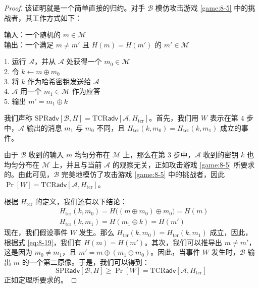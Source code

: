 \begin{proof}
该证明就是一个简单直接的归约。对手 $\mathcal{B}$ 模仿攻击游戏 \ref{game:8-5} 中的挑战者，其工作方式如下：

\vspace{5pt}

\hspace*{5pt} 输入：一个随机的 $m\in\mathcal{M}$\\
\hspace*{26pt} 输出：一个满足 $m\neq m'$ 且 $H(m)=H(m')$ 的 $m'\in\mathcal{M}$

\vspace{5pt}

\hspace*{5pt} 1. \quad 运行 $\mathcal{A}$，并从 $\mathcal{A}$ 处获得一个 $m_0\in\mathcal{M}$\\
\hspace*{26pt} 2. \quad 令 $k\leftarrow m\oplus m_0$\\
\hspace*{26pt} 3. \quad 将 $k$ 作为哈希密钥发送给 $\mathcal{A}$\\
\hspace*{26pt} 4. \quad $\mathcal{A}$ 用一个 $m_1\in\mathcal{M}$ 作为应答\\
\hspace*{26pt} 5. \quad 输出 $m'=m_1\oplus k$

\vspace{5pt}

\noindent
我们声称 $\mathrm{SPR}\mathsf{adv}[\mathcal{B},H]=\mathrm{TCR}\mathsf{adv}[\mathcal{A},H_\mathrm{tcr}]$。首先，我们用 $W$ 表示在第 $4$ 步中，$\mathcal{A}$ 输出的消息 $m_1$ 与 $m_0$ 不同，且 $H_\mathrm{tcr}(k,m_0)=H_\mathrm{tcr}(k,m_1)$ 成立的事件。

由于 $\mathcal{B}$ 收到的输入 $m$ 均匀分布在 $\mathcal{M}$ 上，那么在第 $3$ 步中，$\mathcal{A}$ 收到的密钥 $k$ 也均匀分布在 $\mathcal{M}$ 上，并且与当前 $\mathcal{A}$ 的观察无关，正如攻击游戏 \ref{game:8-5} 所要求的。由此可见，$\mathcal{B}$ 完美地模仿了攻击游戏 \ref{game:8-5} 中的挑战者，因此 $\Pr[W]=\mathrm{TCR}\mathsf{adv}[\mathcal{A},H_\mathrm{tcr}]$。

根据 $H_\mathrm{tcr}$ 的定义，我们还有以下结论：
\begin{equation}\label{eq:8-19}
\begin{aligned}
& H_\mathrm{tcr}(k,m_0) = H\big((m\oplus m_0)\oplus m_0\big)=H(m)\\
& H_\mathrm{tcr}(k,m_1) = H(m_1\oplus k) = H(m')
\end{aligned}
\end{equation}
现在，我们假设事件 $W$ 发生。那么 $H_\mathrm{tcr}(k,m_0)=H_\mathrm{tcr}(k,m_1)$ 成立，因此，根据式 \ref{eq:8-19}，我们有 $H(m)=H(m')$。其次，我们可以推导出 $m\neq m'$，这是因为 $m_0\neq m_1$，且 $m'=m\oplus(m_1\oplus m_0)$。因此，当事件 $W$ 发生时，$\mathcal{B}$ 输出 $m$ 的一个第二原像。于是，我们可以得到：
\[
\mathrm{SPR}\mathsf{adv}[\mathcal{B},H]
\geq
\Pr[W]
=
\mathrm{TCR}\mathsf{adv}[\mathcal{A},H_\mathrm{tcr}]
\]
正如定理所要求的。
\end{proof}

